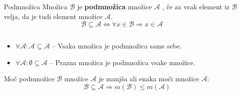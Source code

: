         \begin{frame}
            \begin{columns}[T]
                    \begin{alertblock}{Podmnožica}
                        Množica $\mathcal{B}$ je \textbf{podmnožica} množice $\mathcal{A}$ , če za vsak element iz
                        $\mathcal{B}$ velja, da je tudi element množice $\mathcal{A}$.
                        $$ \mathcal{B}\subseteq\mathcal{A}\Leftrightarrow\forall x\in\mathcal{B}\Rightarrow x\in\mathcal{A} $$
                    \end{alertblock}


                    \begin{block}{}
                    \end{block}

            \end{columns}  

            \begin{block}{}
                \begin{itemize}
                    \item $\forall \mathcal{A}:\mathcal{A}\subseteq\mathcal{A}$ -- Vsaka množica je podmnožica
                        same sebe.
                    \item $\forall \mathcal{A}:\emptyset\subseteq\mathcal{A}$ -- Prazna množica je podmnožica
                        vsake množice.
                \end{itemize}
            \end{block}

            \begin{block}{}
                Moč podmnožice $\mathcal{B}$ množice $\mathcal{A}$ je manjša ali enaka moči množice $\mathcal{A}$:
                $$\mathcal{B}\subseteq\mathcal{A}\Rightarrow m(\mathcal{B})\leq m(\mathcal{A})$$
            \end{block}

        \end{frame}

